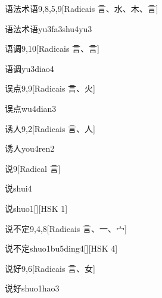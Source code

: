 \begin{entry}{语法术语}{9,8,5,9}[Radicais ⾔、⽔、⽊、⾔]
  \begin{phonetics}{语法术语}{yu3fa3shu4yu3}
  \end{phonetics}
\end{entry}

\begin{entry}{语调}{9,10}[Radicais ⾔、⾔]
  \begin{phonetics}{语调}{yu3diao4}
  \end{phonetics}
\end{entry}

\begin{entry}{误点}{9,9}[Radicais ⾔、⽕]
  \begin{phonetics}{误点}{wu4dian3}
  \end{phonetics}
\end{entry}

\begin{entry}{诱人}{9,2}[Radicais ⾔、⼈]
  \begin{phonetics}{诱人}{you4ren2}
  \end{phonetics}
\end{entry}

\begin{entry}{说}{9}[Radical ⾔]
  \begin{phonetics}{说}{shui4}
  \end{phonetics}
  \begin{phonetics}{说}{shuo1}[][HSK 1]
  \end{phonetics}
\end{entry}

\begin{entry}{说不定}{9,4,8}[Radicais ⾔、⼀、⼧]
  \begin{phonetics}{说不定}{shuo1bu5ding4}[][HSK 4]
  \end{phonetics}
\end{entry}

\begin{entry}{说好}{9,6}[Radicais ⾔、⼥]
  \begin{phonetics}{说好}{shuo1hao3}
  \end{phonetics}
\end{entry}

